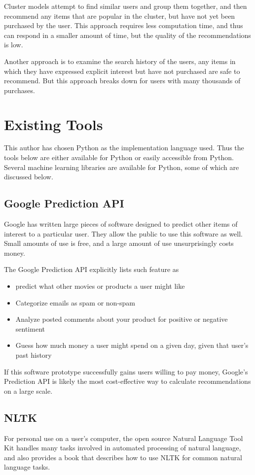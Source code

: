 \documentclass[12pt]{article}
\begin{document}
Cluster models attempt to find similar users and group them together, and then recommend any items that are
popular in the cluster, but have not yet been purchased by the user. This approach requires less computation
time, and thus can respond in a smaller amount of time, but the quality of the recommendations is low.

Another approach is to examine the search history of the users, any items in which they have expressed
explicit interest but have not purchased are safe to recommend. But this approach breaks down for users with
many thousands of purchases.

\section{Existing Tools}
This author has chosen Python as the implementation language used. Thus the tools below are either available
for Python or easily accessible from Python. Several machine learning libraries are available for Python, some
of which are discussed below.
\subsection{Google Prediction API}
Google has written large pieces of software designed to predict other items of interest to a particular
user. They allow the public to use this software as well. Small amounts of use is free, and a large amount of
use unsurprisingly costs money. \citep{GooglePrediction:2013:Online}

The Google Prediction API explicitly lists such feature as
\begin{itemize}
\item predict what other movies or products a user might like
\item Categorize emails as spam or non-spam
\item Analyze posted comments about your product for positive or negative sentiment
\item Guess how much money a user might spend on a given day, given that user's past history
\end{itemize}

If this software prototype successfully gains users willing to pay money, Google's Prediction API is likely
the most cost-effective way to calculate recommendations on a large scale.
\subsection{NLTK}
For personal use on a user's computer, the open source Natural Language Tool Kit handles many tasks involved
in automated processing of natural language, and also provides a book that describes how to use NLTK for
common natural language tasks. \citep{NLTK:2013:Online}
\end{document}
